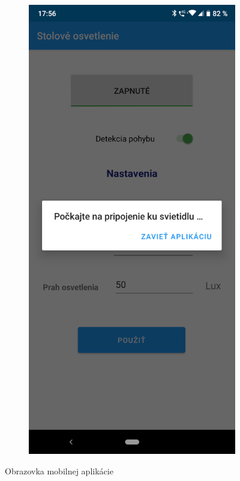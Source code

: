 \documentclass[12pt, a4paper]{article}
\begin{document}
\begin{figure}[h]
\begin{subfigure}[b]{0.45\textwidth}
\end{subfigure}
\hfill
\begin{subfigure}[b]{0.45\textwidth}
	\centering
	\includegraphics[width=\textwidth]{assets/mobile-app-connect.png}
\end{subfigure}
\caption{Obrazovka mobilnej aplikácie}
\label{fig:mobile-app}
\end{figure}
\end{document}
